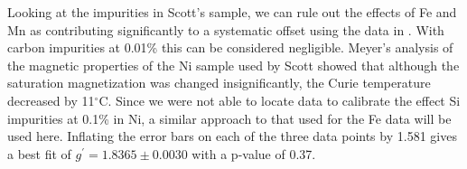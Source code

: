 \documentclass[preprint,12pt]{elsarticle}
\begin{document}
Looking at the impurities in Scott's sample, we can rule out the effects of Fe and Mn as contributing significantly to a systematic offset using the data in \cite{Standley1955, Scott1969}. With carbon impurities at 0.01\% this can be considered negligible. Meyer's analysis of the magnetic properties of the Ni sample used by Scott showed that although the saturation magnetization was changed insignificantly, the Curie temperature decreased by 11$^{\circ}$C. Since we were not able to locate data to calibrate the effect Si impurities at 0.1\% in Ni, a similar approach to that used for the Fe data will be used here. Inflating the error bars on each of the three data points by 1.581 gives a best fit of $g^{\prime}=1.8365\pm$0.0030 with a p-value of 0.37.  

\end{document}
